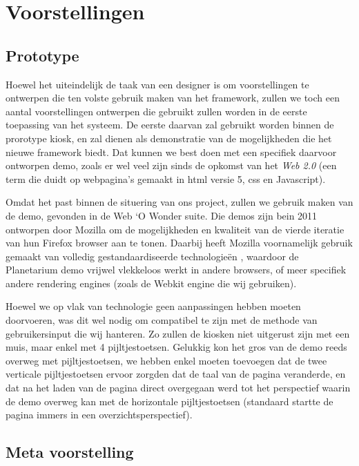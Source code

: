 \part{Voorstellingen}
\label{voorstellingen}

\chapter{Prototype}

Hoewel het uiteindelijk de taak van een designer is om voorstellingen te ontwerpen die ten volste gebruik maken van het framework, zullen we toch een aantal voorstellingen ontwerpen die gebruikt zullen worden in de eerste toepassing van het systeem. De eerste daarvan zal gebruikt worden binnen de prorotype kiosk, en zal dienen als demonstratie van de mogelijkheden die het nieuwe framework biedt. Dat kunnen we best doen met een specifiek daarvoor ontworpen demo, zoals er wel veel zijn sinds de opkomst van het \emph{Web 2.0} (een term die duidt op webpagina's gemaakt in \ac{html} versie 5, \ac{css} en Javascript).

Omdat het past binnen de situering van ons project, zullen we gebruik maken van de  demo, gevonden in de Web ‘O Wonder suite. Die demos zijn bein 2011 ontworpen door Mozilla om de mogelijkheden en kwaliteit van de vierde iteratie van hun Firefox browser aan te tonen. Daarbij heeft Mozilla voornamelijk gebruik gemaakt van volledig gestandaardiseerde technologieën \citep{webowonder}, waardoor de Planetarium demo vrijwel vlekkeloos werkt in andere browsers, of meer specifiek andere rendering engines (zoals de Webkit engine die wij gebruiken).

Hoewel we op vlak van technologie geen aanpassingen hebben moeten doorvoeren, was dit wel nodig om compatibel te zijn met de methode van gebruikersinput die wij hanteren. Zo zullen de kiosken niet uitgerust zijn met een muis, maar enkel met 4 pijltjestoetsen. Gelukkig kon het gros van de demo reeds overweg met pijltjestoetsen, we hebben enkel moeten toevoegen dat de twee verticale pijltjestoetsen ervoor zorgden dat de taal van de pagina veranderde, en dat na het laden van de pagina direct overgegaan werd tot het perspectief waarin de demo overweg kan met de horizontale pijltjestoetsen (standaard startte de pagina immers in een overzichtsperspectief).

\chapter{Meta voorstelling}

